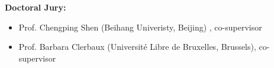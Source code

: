 \afterpage{\blankpage}
\thispagestyle{empty}
\begin{Large}
\textbf{Doctoral Jury:}
\end{Large}
\begin{itemize}
\item{Prof. Chengping Shen   (Beihang Univeristy, Beijing)              , co-supervisor}
\item{Prof. Barbara Clerbaux (Universit\'e Libre de Bruxelles, Brussels), co-supervisor}
\end{itemize}


\newpage
{}
